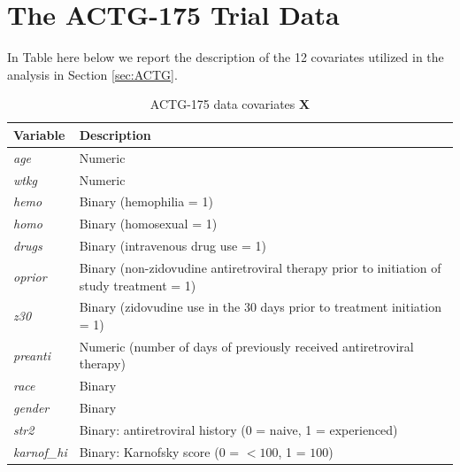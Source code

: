 \documentclass[nohyperref]{article}
\theoremstyle{plain}
\theoremstyle{definition}
\theoremstyle{remark}
\begin{document}
\section{The ACTG-175 Trial Data} \label{sec:appenB}

In Table here below we report the description of the 12 covariates utilized in the analysis in Section \ref{sec:ACTG}.

\begin{table}[h]
		\caption{ACTG-175 data covariates $\bm{X}$}
		\centering \footnotesize
		\begin{tabularx}{10.5cm}{l | X}
			
			\textbf{Variable}  &  \textbf{Description} \\
			\midrule
			
			\textit{age} &  Numeric	\\	
			\textit{wtkg} &	Numeric	\\	
			\textit{hemo} &	 Binary (hemophilia = 1)	\\	
			\textit{homo} &	 Binary (homosexual = 1)	\\
			\textit{drugs} & Binary (intravenous drug use = 1)	\\
			\textit{oprior} & Binary (non-zidovudine antiretroviral therapy prior to initiation of study treatment = 1) \\
			\textit{z30} &	Binary (zidovudine use in the 30 days prior to treatment initiation = 1)	\\
			\textit{preanti} &	Numeric (number of days of previously received antiretroviral therapy)	\\	
			\textit{race} &	 Binary	\\	
			\textit{gender} &	Binary 	\\
			\textit{str2} &	 Binary: antiretroviral history (0 = naive, 1 = experienced)   \\
			\textit{karnof\_hi} &	Binary: Karnofsky score (0 = $<100$, 1 = $100$)	
			\label{AIDSvar}
		\end{tabularx}
	\end{table}
\end{document}
